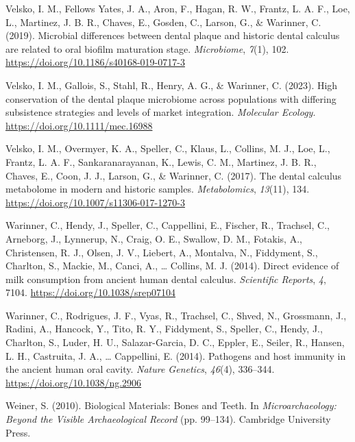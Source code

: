 \documentclass[
  letterpaper,
]{book}
\newlength{\cslhangindent}
\newlength{\cslentryspacingunit} %
\newenvironment{CSLReferences}[2] %
 {%
  \setlength{\parindent}{0pt}
  \ifodd #1
  \let\oldpar\par
  \def\par{\hangindent=\cslhangindent\oldpar}
  \fi
  \setlength{\parskip}{#2\cslentryspacingunit}
 }%
 {}
\begin{document}
\begin{CSLReferences}{1}{0}
\leavevmode{}%
Velsko, I. M., Fellows Yates, J. A., Aron, F., Hagan, R. W., Frantz, L.
A. F., Loe, L., Martinez, J. B. R., Chaves, E., Gosden, C., Larson, G.,
\& Warinner, C. (2019). Microbial differences between dental plaque and
historic dental calculus are related to oral biofilm maturation stage.
\emph{Microbiome}, \emph{7}(1), 102.
\url{https://doi.org/10.1186/s40168-019-0717-3}

\leavevmode{}%
Velsko, I. M., Gallois, S., Stahl, R., Henry, A. G., \& Warinner, C.
(2023). High conservation of the dental plaque microbiome across
populations with differing subsistence strategies and levels of market
integration. \emph{Molecular Ecology}.
\url{https://doi.org/10.1111/mec.16988}

\leavevmode{}%
Velsko, I. M., Overmyer, K. A., Speller, C., Klaus, L., Collins, M. J.,
Loe, L., Frantz, L. A. F., Sankaranarayanan, K., Lewis, C. M., Martinez,
J. B. R., Chaves, E., Coon, J. J., Larson, G., \& Warinner, C. (2017).
The dental calculus metabolome in modern and historic samples.
\emph{Metabolomics}, \emph{13}(11), 134.
\url{https://doi.org/10.1007/s11306-017-1270-3}

\leavevmode{}%
Warinner, C., Hendy, J., Speller, C., Cappellini, E., Fischer, R.,
Trachsel, C., Arneborg, J., Lynnerup, N., Craig, O. E., Swallow, D. M.,
Fotakis, A., Christensen, R. J., Olsen, J. V., Liebert, A., Montalva,
N., Fiddyment, S., Charlton, S., Mackie, M., Canci, A., \ldots{}
Collins, M. J. (2014). Direct evidence of milk consumption from ancient
human dental calculus. \emph{Scientific Reports}, \emph{4}, 7104.
\url{https://doi.org/10.1038/srep07104}

\leavevmode{}%
Warinner, C., Rodrigues, J. F., Vyas, R., Trachsel, C., Shved, N.,
Grossmann, J., Radini, A., Hancock, Y., Tito, R. Y., Fiddyment, S.,
Speller, C., Hendy, J., Charlton, S., Luder, H. U., Salazar-Garcia, D.
C., Eppler, E., Seiler, R., Hansen, L. H., Castruita, J. A., \ldots{}
Cappellini, E. (2014). Pathogens and host immunity in the ancient human
oral cavity. \emph{Nature Genetics}, \emph{46}(4), 336--344.
\url{https://doi.org/10.1038/ng.2906}

\leavevmode{}%
Weiner, S. (2010). Biological {Materials}: {Bones} and {Teeth}. In
\emph{Microarchaeology: {Beyond} the {Visible Archaeological Record}}
(pp. 99--134). {Cambridge University Press}.


\end{CSLReferences}
\end{document}
